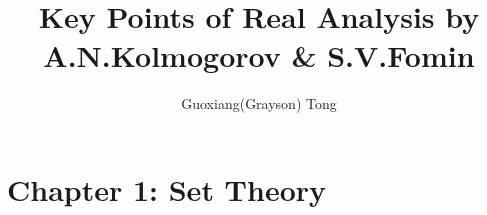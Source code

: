 \documentclass[]{aiaa-tc}%
\title{Key Points of Real Analysis by A.N.Kolmogorov \& S.V.Fomin}
\author{Guoxiang(Grayson) Tong}
\begin{document}
\maketitle
\section{Chapter 1: Set Theory}




\end{document}
